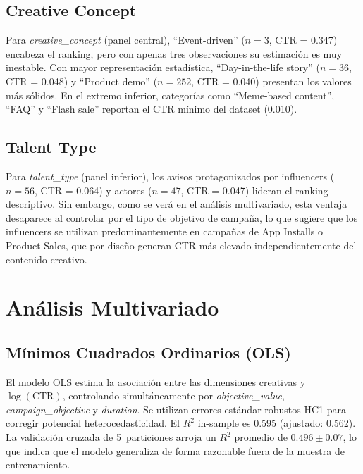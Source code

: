 \documentclass[12pt, a4paper]{report}
\begin{document}
\subsection{Creative Concept}

Para \textit{creative\_concept} (panel central), ``Event-driven''
($n = 3$, CTR = 0.347) encabeza el ranking, pero con apenas tres
observaciones su estimación es muy inestable. Con mayor representación
estadística, ``Day-in-the-life story'' ($n = 36$, CTR = 0.048) y
``Product demo'' ($n = 252$, CTR = 0.040) presentan los valores más
sólidos. En el extremo inferior, categorías como ``Meme-based content'',
``FAQ'' y ``Flash sale'' reportan el CTR mínimo del dataset (0.010).

\subsection{Talent Type}

Para \textit{talent\_type} (panel inferior), los avisos protagonizados
por influencers ($n = 56$, CTR = 0.064) y actores ($n = 47$,
CTR = 0.047) lideran el ranking descriptivo. Sin embargo, como se verá
en el análisis multivariado, esta ventaja desaparece al controlar por el
tipo de objetivo de campaña, lo que sugiere que los influencers se
utilizan predominantemente en campañas de App Installs o Product Sales,
que por diseño generan CTR más elevado independientemente del contenido
creativo.

\section{Análisis Multivariado}

\subsection{Mínimos Cuadrados Ordinarios (OLS)}

El modelo OLS estima la asociación entre las dimensiones creativas y
$\log(\text{CTR})$, controlando simultáneamente por
\textit{objective\_value}, \textit{campaign\_objective} y
\textit{duration}. Se utilizan errores estándar robustos HC1
\citep{white1980} para corregir potencial heterocedasticidad.
El $R^2$ in-sample es 0.595 (ajustado: 0.562). La validación cruzada de
5~particiones arroja un $R^2$ promedio de $0.496 \pm 0.07$, lo que
indica que el modelo generaliza de forma razonable fuera de la muestra
de entrenamiento.
\end{document}
